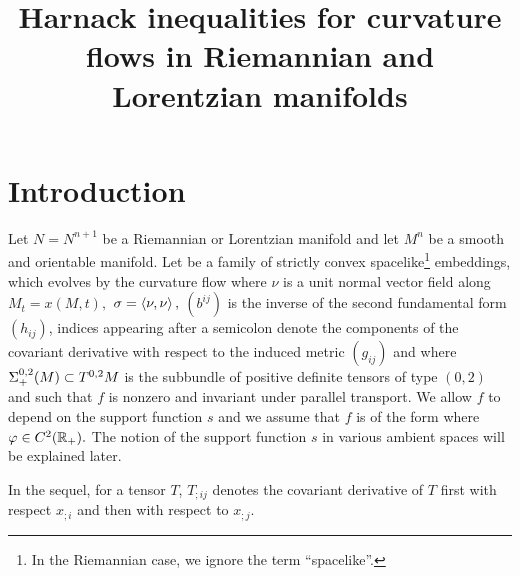 
\newcommand*\xbar[1]{%
  \hbox{%
    \vbox{%
      \hrule height 0.2pt %
      \kern0.5ex%
      \hbox{%
        \kern-0.1em%
        \ensuremath{#1}%
        \kern-0.1em%
      }%
    }%
  }%
}



\title[Harnack inequalities for curvature flows]{Harnack inequalities for curvature flows in Riemannian and Lorentzian manifolds}

\maketitle
\section{Introduction}
Let $N=N^{n+1}$ be a Riemannian or Lorentzian manifold and let $M^{n}$ be a smooth and orientable manifold. Let
\eq{x\cn M^{n}\x[0,T^{\ast})\ra N}
be a family of strictly convex spacelike\footnote{In the Riemannian case, we ignore the term ``spacelike''.} embeddings, which evolves by the curvature flow
where $\nu$ is a unit normal vector field along $M_{t}=x(M,t),$ $\sigma=\left\langle \nu,\nu \right\rangle,$ $(b^{ij})$ is the inverse of the second fundamental form $(h_{ij})$, indices appearing after a semicolon denote the components of the covariant derivative with respect to the induced metric $(g_{ij})$ and
where $\Sigma^{0,2}_{+}(M)\subset T^{0,2}M$ is the subbundle of positive definite tensors of type $(0,2)$ and such that $f$ is nonzero and invariant under parallel transport.
We allow $f$ to depend on the support function $s$ and we assume that $f$ is of the form
where $\varphi\in C^2(\mathbb{R}_+).$
The notion of the support function $s$ in various ambient spaces will be explained later.

In the sequel, for a tensor $T$, $T_{;ij}$ denotes the covariant derivative of $T$ first with respect $x_{;i}$ and then with respect to $x_{;j}.$ 

